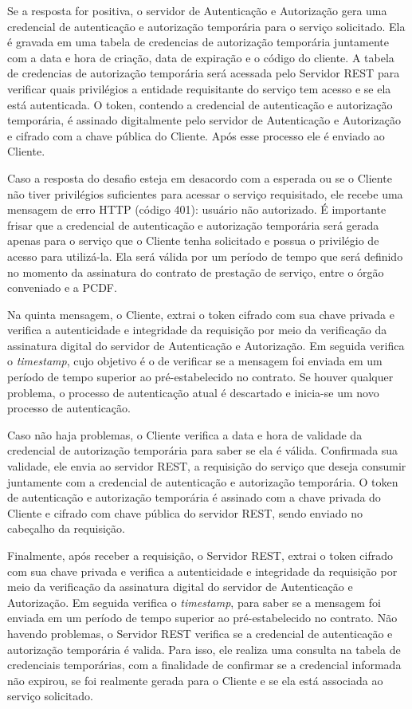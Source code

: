 Se a resposta for positiva, o servidor de Autenticação e Autorização gera uma credencial de autenticação e autorização temporária para o serviço solicitado. Ela é gravada em uma tabela de credencias de autorização temporária juntamente com a data e hora de criação, data de expiração e o código do cliente. A tabela de credencias de autorização temporária será acessada pelo Servidor REST  para verificar quais privilégios a entidade requisitante do serviço tem acesso e se ela está autenticada. O token, contendo a credencial de autenticação e autorização temporária, é  assinado digitalmente pelo servidor de Autenticação e Autorização   e cifrado  com a chave pública do Cliente. Após esse processo ele é enviado ao Cliente.

Caso a resposta do desafio esteja em desacordo com a esperada ou se o Cliente não tiver privilégios suficientes para acessar o serviço requisitado, ele recebe uma mensagem de erro HTTP (código 401): usuário não autorizado.
É importante frisar que a credencial de autenticação e autorização temporária será gerada apenas para o serviço que o Cliente tenha solicitado e possua o privilégio de acesso para utilizá-la. Ela será válida por um período  de tempo que será definido no momento da assinatura do contrato de prestação de serviço, entre o órgão conveniado e a PCDF.

Na quinta mensagem, o Cliente, extrai o token cifrado com sua chave privada e verifica a autenticidade e integridade da requisição por meio da verificação da assinatura digital do servidor de Autenticação e Autorização. Em seguida verifica o \emph{timestamp}, cujo objetivo é o de verificar se a mensagem foi enviada em um período de tempo superior ao pré-estabelecido no contrato. Se houver qualquer problema, o processo de autenticação atual é descartado e inicia-se um novo processo de autenticação.

Caso não haja problemas, o Cliente verifica a data e hora de validade da credencial de autorização temporária para saber se ela é válida. Confirmada sua validade, ele envia ao servidor REST, a requisição do serviço que deseja consumir juntamente com a credencial de autenticação e autorização temporária. O token de autenticação e autorização temporária é assinado com a chave privada do Cliente e cifrado com chave pública do servidor REST, sendo enviado no cabeçalho da requisição.

Finalmente, após receber a requisição, o Servidor REST, extrai o token cifrado com sua chave privada e verifica a autenticidade e integridade da requisição por meio da verificação da assinatura digital do servidor de Autenticação e Autorização. Em seguida verifica o \emph{timestamp}, para saber se a mensagem foi enviada em um período de tempo superior ao pré-estabelecido no contrato. Não havendo problemas, o Servidor REST verifica se a credencial de autenticação e autorização temporária é valida. Para isso, ele realiza uma consulta na tabela de credenciais temporárias, com a finalidade de confirmar se a credencial informada não expirou, se  foi realmente gerada para o Cliente e se ela está associada ao serviço solicitado.

